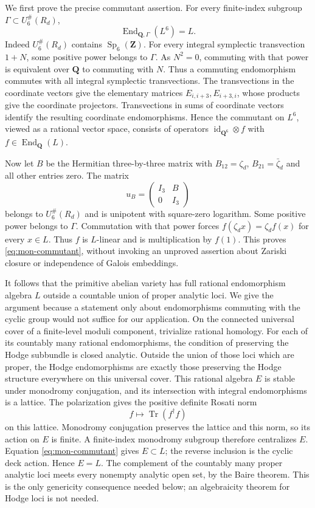 We first prove the precise commutant assertion. For every finite-index
subgroup $\Gamma\subset U_6^\#(R_d)$,
\begin{equation}\label{eq:mon-commutant}
               \operatorname{End}_{\mathbf Q,\Gamma}(L^6)=L.
\end{equation}
Indeed $U_6^\#(R_d)$ contains $\operatorname{Sp}_6(\mathbf Z)$.
For every integral symplectic transvection $1+N$, some positive power
belongs to $\Gamma$. As $N^2=0$, commuting with that power is equivalent
over $\mathbf Q$ to commuting with $N$. Thus a commuting endomorphism
commutes with all integral symplectic transvections. The transvections
in the coordinate vectors give the elementary matrices
$E_{i,i+3},E_{i+3,i}$, whose products give the coordinate projectors.
Transvections in sums of coordinate vectors identify the resulting
coordinate endomorphisms. Hence the commutant on $L^6$, viewed as a
rational vector space, consists of operators
$\operatorname{id}_{\mathbf Q^6}\otimes f$ with
$f\in\operatorname{End}_{\mathbf Q}(L)$.

Now let $B$ be the Hermitian three-by-three matrix with
$B_{12}=\zeta_d$, $B_{21}=\bar\zeta_d$ and all other entries zero.
The matrix
\[
                          u_B=\begin{pmatrix}I_3&B\\0&I_3\end{pmatrix}
\]
belongs to $U_6^\#(R_d)$ and is unipotent with square-zero logarithm.
Some positive power belongs to $\Gamma$. Commutation with that power
forces $f(\zeta_d x)=\zeta_d f(x)$ for every $x\in L$. Thus $f$ is
$L$-linear and is multiplication by $f(1)$. This proves
\eqref{eq:mon-commutant}, without invoking an unproved assertion about
Zariski closure or independence of Galois embeddings.

It follows that the primitive abelian variety has full rational
endomorphism algebra $L$ outside a countable union of proper analytic
loci. We give the argument because a statement only about endomorphisms
commuting with the cyclic group would not suffice for our application.
On the connected universal cover of a finite-level moduli component,
trivialize rational homology. For each of its countably many rational
endomorphisms, the condition of preserving the Hodge subbundle is closed
analytic. Outside the union of those loci which are proper, the Hodge
endomorphisms are exactly those preserving the Hodge structure everywhere
on this universal cover. This rational algebra $E$ is stable under
monodromy conjugation, and its intersection with integral endomorphisms
is a lattice. The polarization gives the positive definite Rosati norm
\[
                         f\longmapsto\operatorname{Tr}(f^\dagger f)
\]
on this lattice. Monodromy conjugation preserves the lattice and this
norm, so its action on $E$ is finite. A finite-index monodromy subgroup
therefore centralizes $E$. Equation \eqref{eq:mon-commutant} gives
$E\subset L$; the reverse inclusion is the cyclic deck action. Hence
$E=L$. The complement of the countably many proper analytic loci meets
every nonempty analytic open set, by the Baire theorem. This is the only
genericity consequence needed below; an algebraicity theorem for Hodge
loci is not needed.

